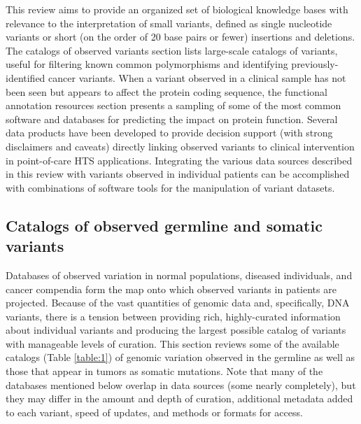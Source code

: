 \documentclass[10pt,letterpaper]{article}
\begin{document}
This review aims to provide
an organized set of biological knowledge bases with relevance to the
interpretation of small variants, defined as single nucleotide
variants or short (on the order of 20 base pairs or fewer) insertions
and deletions. The catalogs of observed variants section lists
large-scale catalogs of variants, useful for filtering known common
polymorphisms and identifying previously-identified cancer
variants. When a variant observed in a clinical sample has not been
seen but appears to affect the protein coding sequence, the functional
annotation resources section presents a sampling of some of the most
common software and databases for predicting the impact on protein
function. Several data products have been developed to provide
decision support (with strong disclaimers and caveats) directly
linking observed variants to clinical intervention in point-of-care
HTS applications. Integrating the various data sources described in
this review with variants observed in individual patients can be
accomplished with combinations of software tools for the manipulation
of variant datasets.

\subsection{Catalogs of observed germline and somatic variants}

Databases of observed variation in normal populations,
diseased individuals, and cancer compendia form the map onto which
observed variants in patients are projected. Because of the vast
quantities of genomic data and, specifically, DNA variants, there is a
tension between providing rich, highly-curated information about
individual variants and producing the largest possible catalog of
variants with manageable levels of curation. This section reviews some
of the available catalogs (Table \ref{table:1}) of genomic variation observed
in the germline as well as those that appear in tumors as somatic
mutations.  Note that many of the databases mentioned below overlap in
data sources (some nearly completely), but they may differ in the
amount and depth of curation, additional metadata added to each
variant, speed of updates, and methods or formats for access.
\end{document}
